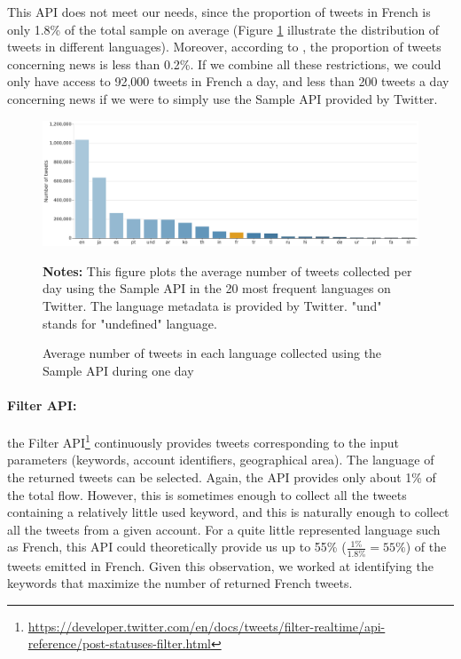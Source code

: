 This API does not meet our needs, since the proportion of tweets in French is only 1.8\% of the total sample on average (Figure \ref{Figure:HistogramLanguages} illustrate the distribution of tweets in different languages). Moreover, according to \citet{liu_reuters_2016}, the proportion of tweets concerning news is less than 0.2\%. If we combine all these restrictions, we could only have access to 92,000 tweets in French a day, and less than 200 tweets a day concerning news if we were to simply use the Sample API provided by Twitter.

\begin{figure}
\begin{center}
\includegraphics[width=1\textwidth]{figures/HistogramLanguages.pdf}
\end{center}
{\scriptsize \textbf{Notes:} This figure plots the average number of tweets collected  per day using the Sample API in the 20 most frequent languages on Twitter. The language metadata is provided by Twitter. "und" stands for "undefined" language.}
\caption{Average number of tweets in each language collected using the Sample API during one day}
\label{Figure:HistogramLanguages}
\end{figure}


\paragraph{Filter API:}

the Filter API\footnote{\url{https://developer.twitter.com/en/docs/tweets/filter-realtime/api-reference/post-statuses-filter.html}} continuously provides tweets corresponding to the input parameters (keywords, account identifiers, geographical area). The language of the returned tweets can be selected. Again, the API provides only about 1\% of the total flow. However, this is sometimes enough to collect all the tweets containing a relatively little used keyword, and this is naturally enough to collect all the tweets from a given account. For a quite little represented language such as French, this API could theoretically provide us up to 55\% ($\frac{1\%}{1.8\%} = 55\%$) of the tweets emitted in French. Given this observation, we worked at identifying the keywords that maximize the number of returned French tweets.


